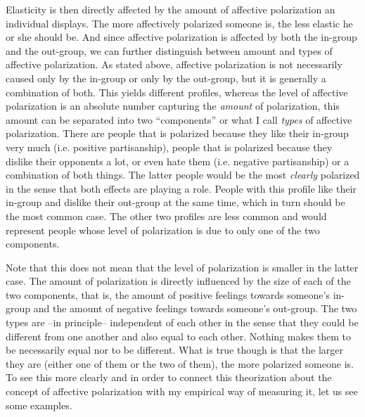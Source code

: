 \documentclass[a4paper, svgnames]{article}
\begin{document}

Elasticity is then directly affected by the amount of affective polarization an individual displays. The more affectively polarized someone is, the less elastic he or she should be. And since affective polarization is affected by both the in-group and the out-group, we can further distinguish between amount and types of affective polarization. As stated above, affective polarization is not necessarily caused only by the in-group or only by the out-group, but it is generally a combination of both. This yields different profiles, whereas the level of affective polarization is an absolute number capturing the \textit{amount} of polarization, this amount can be separated into two ``components'' or what I call \textit{types} of affective polarization. There are people that is polarized because they like their in-group very much (i.e. positive partisanship), people that is polarized because they dislike their opponents a lot, or even hate them (i.e.  negative partisanship) or a combination of both things. The latter people would be the most \textit{clearly} polarized in the sense that both effects are playing a role. People with this profile like their in-group and dislike their out-group at the same time, which in turn should be the most common case. The other two profiles are less common and would represent people whose level of polarization is due to only one of the two components.

Note that this does not mean that the level of polarization is smaller in the latter case. The amount of polarization is directly influenced by the size of each of the two components, that is, the amount of positive feelings towards someone's in-group and the amount of negative feelings towards someone's out-group. The two types are --in principle-- independent of each other in the sense that they could be different from one another and also equal to each other. Nothing makes them to be necessarily equal nor to be different. What is true though is that the larger they are (either one of them or the two of them), the more polarized someone is. To see this more clearly and in order to connect this theorization about the concept of affective polarization with my empirical way of measuring it, let us see some examples. 
\end{document}
